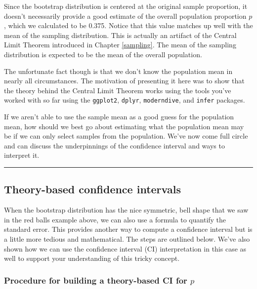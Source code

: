 \documentclass[12pt, krantz2,]{krantz}
\begin{document}
Since the bootstrap distribution is centered at the original sample proportion, it doesn't necessarily provide a good estimate of the overall population proportion \(p\), which we calculated to be 0.375. Notice that this value matches up well with the mean of the sampling distribution. This is actually an artifact of the Central Limit Theorem introduced in Chapter \ref{sampling}. The mean of the sampling distribution is expected to be the mean of the overall population.

The unfortunate fact though is that we don't know the population mean in nearly all circumstances. The motivation of presenting it here was to show that the theory behind the Central Limit Theorem works using the tools you've worked with so far using the \texttt{ggplot2}, \texttt{dplyr}, \texttt{moderndive}, and \texttt{infer} packages.

If we aren't able to use the sample mean as a good guess for the population mean, how should we best go about estimating what the population mean may be if we can only select samples from the population. We've now come full circle and can discuss the underpinnings of the confidence interval and ways to interpret it.

\begin{center}\rule{0.5\linewidth}{\linethickness}\end{center}

\hypertarget{theory-ci}{%
\subsection{Theory-based confidence intervals}\label{theory-ci}}

When the bootstrap distribution has the nice symmetric, bell shape that we saw in the red balls example above, we can also use a formula to quantify the standard error. This provides another way to compute a confidence interval but is a little more tedious and mathematical. The steps are outlined below. We've also shown how we can use the confidence interval (CI) interpretation in this case as well to support your understanding of this tricky concept.

\hypertarget{procedure-for-building-a-theory-based-ci-for-p}{%
\subsubsection*{\texorpdfstring{Procedure for building a theory-based CI for \(p\)}{Procedure for building a theory-based CI for p}}\label{procedure-for-building-a-theory-based-ci-for-p}}
\end{document}
